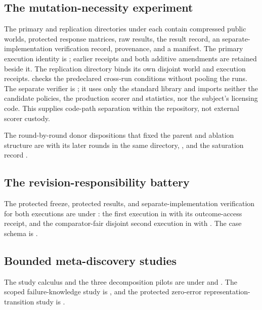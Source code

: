 \subsection{The mutation-necessity experiment}
The primary and replication directories under
 each contain compressed public
worlds, protected response matrices, raw results, the result record, an
separate-implementation verification record, provenance, and a 
manifest.
The primary execution identity is ;
earlier receipts and both additive amendments are retained beside it. The
replication directory binds its own disjoint world and execution receipts.
 checks the predeclared cross-run
conditions without pooling the runs. The separate verifier is
; it uses only
the standard library and imports neither the candidate policies, the production
scorer and statistics, nor the subject's licensing code. This supplies code-path
separation within the repository, not external scorer custody.

The round-by-round donor dispositions that fixed the parent and ablation
structure are 
with its later rounds in the same directory,
, and the saturation record
.

\subsection{The revision-responsibility battery}
The protected freeze, protected results, and separate-implementation verification
for both executions are under : the first execution in
 with its outcome-access receipt, and
the comparator-fair disjoint second execution in
 with
. The case schema is
.

\subsection{Bounded meta-discovery studies}
The study calculus and the three decomposition pilots are under
 and
. The scoped failure-knowledge
study is , and the
protected zero-error representation-transition study is
.

